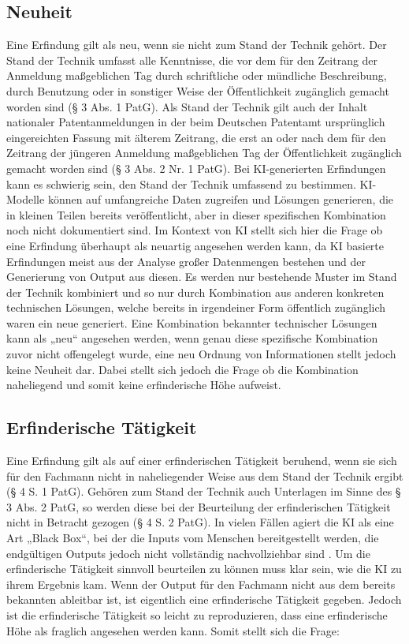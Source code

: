 \subsection{Neuheit}
Eine Erfindung gilt als neu, wenn sie nicht zum Stand der Technik gehört. 
Der Stand der Technik umfasst alle Kenntnisse, 
die vor dem für den Zeitrang der Anmeldung
maßgeblichen Tag durch schriftliche 
oder mündliche Beschreibung, durch Benutzung oder in
sonstiger Weise der Öffentlichkeit zugänglich gemacht worden sind (§ 3 Abs. 1 PatG).
Als Stand der Technik gilt auch der Inhalt nationaler Patentanmeldungen 
in der beim Deutschen
Patentamt ursprünglich eingereichten Fassung mit älterem Zeitrang, 
die erst an oder nach dem für
den Zeitrang der jüngeren Anmeldung maßgeblichen Tag der Öffentlichkeit 
zugänglich gemacht
worden sind (§ 3 Abs. 2 Nr. 1 PatG). 
Bei KI-generierten Erfindungen kann es schwierig sein, 
den Stand der Technik umfassend zu bestimmen. 
KI-Modelle können auf umfangreiche Daten zugreifen und Lösungen generieren, 
die in kleinen Teilen bereits veröffentlicht, 
aber in dieser spezifischen Kombination noch nicht dokumentiert sind.
Im Kontext von KI stellt sich hier die Frage 
ob eine Erfindung überhaupt als neuartig angesehen werden kann, 
da KI basierte Erfindungen meist aus der Analyse großer Datenmengen bestehen
und der Generierung von Output aus diesen. 
Es werden nur bestehende Muster im Stand der Technik kombiniert 
und so nur durch Kombination aus anderen konkreten technischen Lösungen, 
welche bereits in irgendeiner Form öffentlich zugänglich waren ein neue generiert.
Eine Kombination bekannter technischer Lösungen kann als „neu“ angesehen werden,
wenn genau diese spezifische Kombination zuvor nicht offengelegt wurde, 
eine neu Ordnung von Informationen stellt jedoch keine Neuheit dar.
Dabei stellt sich jedoch die Frage ob die Kombination naheliegend und
somit keine erfinderische Höhe aufweist.

\subsection{Erfinderische Tätigkeit}
Eine Erfindung gilt als auf einer erfinderischen Tätigkeit beruhend, 
wenn sie sich für den Fachmann
nicht in naheliegender Weise aus dem Stand der Technik ergibt (§ 4 S. 1 PatG). 
Gehören zum Stand
der Technik auch Unterlagen im Sinne des § 3 Abs. 2 PatG, 
so werden diese bei der Beurteilung der
erfinderischen Tätigkeit nicht in Betracht gezogen (§ 4 S. 2 PatG).
In vielen Fällen agiert die KI als eine Art „Black Box“, 
bei der die Inputs vom Menschen bereitgestellt werden, 
die endgültigen Outputs jedoch nicht vollständig nachvollziehbar sind 
\cite{pauliniKIgenerierteErfindungPatentrechtliche}. 
Um die erfinderische Tätigkeit sinnvoll beurteilen zu können
muss klar sein, wie die KI zu ihrem Ergebnis kam. 
Wenn der Output für den Fachmann nicht aus dem bereits bekannten 
ableitbar ist, ist eigentlich eine erfinderische Tätigkeit gegeben.
Jedoch ist die erfinderische Tätigkeit so leicht zu reproduzieren,
dass eine erfinderische Höhe als fraglich angesehen werden kann.
Somit stellt sich die Frage: 


